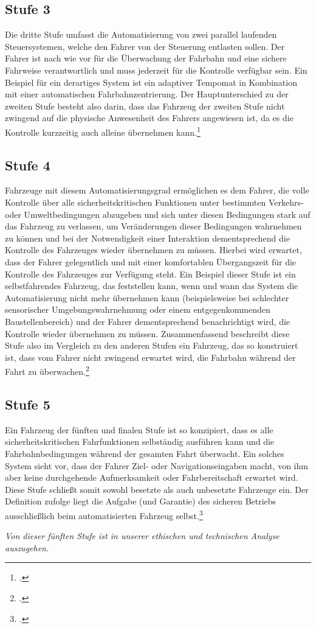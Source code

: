 \documentclass[a4paper, 12pt, openany]{book}
\begin{document}
            \subsection*{Stufe 3}
                Die dritte Stufe umfasst die Automatisierung von zwei parallel laufenden Steuersystemen, welche den Fahrer von der Steuerung entlasten sollen. Der Fahrer ist nach wie vor für die Überwachung der Fahrbahn und eine sichere Fahrweise verantwortlich und muss jederzeit für die Kontrolle verfügbar sein. Ein Beispiel für ein derartiges System ist ein adaptiver Tempomat in Kombination mit einer automatischen Fahrbahnzentrierung. Der Hauptunterschied zu der zweiten Stufe besteht also darin, dass das Fahrzeug der zweiten Stufe nicht zwingend auf die physische Anwesenheit des Fahrers angewiesen ist, da es die Kontrolle kurzzeitig auch alleine übernehmen kann.\footcite[5]{national2013preliminary}
            \subsection*{Stufe 4}
                Fahrzeuge mit diesem Automatisierungsgrad ermöglichen es dem Fahrer, die volle Kontrolle über alle sicherheitskritischen Funktionen unter bestimmten Verkehrs- oder Umweltbedingungen abzugeben und sich unter diesen Bedingungen stark auf das Fahrzeug zu verlassen, um Veränderungen dieser Bedingungen wahrnehmen zu können und bei der Notwendigkeit einer Interaktion dementsprechend die Kontrolle des Fahrzeuges wieder übernehmen zu müssen. Hierbei wird erwartet, dass der Fahrer gelegentlich und mit einer komfortablen Übergangszeit für die Kontrolle des Fahrzeuges zur Verfügung steht. Ein Beispiel dieser Stufe ist ein selbstfahrendes Fahrzeug, das feststellen kann, wenn und wann das System die Automatisierung nicht mehr übernehmen kann (beispielsweise bei schlechter sensorischer Umgebungswahrnehmung oder einem entgegenkommenden Baustellenbereich) und der Fahrer dementsprechend benachrichtigt wird, die Kontrolle wieder übernehmen zu müssen. Zusammenfassend beschreibt diese Stufe also im Vergleich zu den anderen Stufen ein Fahrzeug, das so konstruiert ist, dass vom Fahrer nicht zwingend erwartet wird, die Fahrbahn während der Fahrt zu überwachen.\footcite[5]{national2013preliminary}
            \subsection*{Stufe 5}
                Ein Fahrzeug der fünften und finalen Stufe ist so konzipiert, dass es alle sicherheitskritischen Fahrfunktionen selbständig ausführen kann und die Fahrbahnbedingungen während der gesamten Fahrt überwacht. Ein solches System sieht vor, dass der Fahrer Ziel- oder Navigationseingaben macht, von ihm aber keine durchgehende Aufmerksamkeit oder Fahrbereitschaft erwartet wird. Diese Stufe schließt somit sowohl besetzte als auch unbesetzte Fahrzeuge ein. Der Definition zufolge liegt die Aufgabe (und Garantie) des sicheren Betriebs ausschließlich beim automatisierten Fahrzeug selbst.\footcite[5]{national2013preliminary}\par
                \textit{Von dieser fünften Stufe ist in unserer ethischen und technischen Analyse auszugehen}.
            
\end{document}

